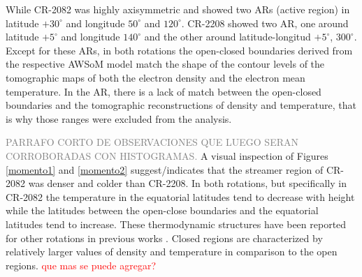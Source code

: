 \documentclass[namedreferences]{solarphysics}
\newcommand{\mdeg}{^\circ}
\def\diego#1{\textcolor{red}{#1}}
\def\temp#1{\textcolor{gray}{#1}}
\begin{document}
\begin{article}
While CR-2082 was highly axisymmetric and showed two ARs (active region) in latitude $+30\mdeg$ and longitude $50\mdeg$ and $120\mdeg$. CR-2208 showed two AR, one around latitude $+5\mdeg$ and longitude $140\mdeg$ and the other around latitude-longitud $+5\mdeg$, $300\mdeg$. Except for these ARs, in both rotations the open-closed boundaries derived from the respective AWSoM model match the shape of the contour levels of the tomographic maps of both the electron density and the electron mean temperature. In the AR, there is a lack of match between the open-closed boundaries and the tomographic reconstructions of density and temperature, that is why those ranges were excluded from the analysis. 

\temp{PARRAFO CORTO DE OBSERVACIONES QUE LUEGO SERAN CORROBORADAS CON HISTOGRAMAS.}
A visual inspection of Figures \ref{momento1} and \ref{momento2} suggest/indicates that the streamer region of CR-2082 was denser and colder than CR-2208. In both rotations, but specifically in CR-2082 the temperature in the equatorial latitudes tend to decrease with height while the latitudes between the open-close boundaries and the equatorial latitudes tend to increase. These thermodynamic structures have been reported for other rotations in previous works \citep{lloveras_2017}. Closed regions are characterized by relatively larger values of density and temperature in comparison to the open regions.
\diego{que mas se puede agregar?}


\end{article}
\end{document}
